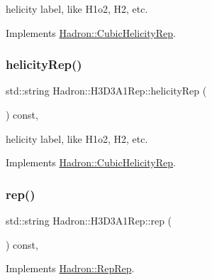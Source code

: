 helicity label, like H1o2, H2, etc. 

Implements \mbox{\hyperlink{structHadron_1_1CubicHelicityRep_af1096946b7470edf0a55451cc662f231}{Hadron\+::\+Cubic\+Helicity\+Rep}}.

\mbox{\label{structHadron_1_1H3D3A1Rep_a70ba9574e123f458fa29aae49a92f425}} 
\subsubsection{\texorpdfstring{helicityRep()}{helicityRep()}\hspace{0.1cm}{\footnotesize\ttfamily [3/3]}}
{\footnotesize\ttfamily std\+::string Hadron\+::\+H3\+D3\+A1\+Rep\+::helicity\+Rep (\begin{DoxyParamCaption}{ }\end{DoxyParamCaption}) const\hspace{0.3cm}{\ttfamily [inline]}, {\ttfamily [virtual]}}

helicity label, like H1o2, H2, etc. 

Implements \mbox{\hyperlink{structHadron_1_1CubicHelicityRep_af1096946b7470edf0a55451cc662f231}{Hadron\+::\+Cubic\+Helicity\+Rep}}.

\mbox{\label{structHadron_1_1H3D3A1Rep_a79c066008e353585d55f726285ae56cd}} 
\subsubsection{\texorpdfstring{rep()}{rep()}\hspace{0.1cm}{\footnotesize\ttfamily [1/5]}}
{\footnotesize\ttfamily std\+::string Hadron\+::\+H3\+D3\+A1\+Rep\+::rep (\begin{DoxyParamCaption}{ }\end{DoxyParamCaption}) const\hspace{0.3cm}{\ttfamily [inline]}, {\ttfamily [virtual]}}



Implements \mbox{\hyperlink{structHadron_1_1RepRep_ab3213025f6de249f7095892109575fde}{Hadron\+::\+Rep\+Rep}}.

\mbox{\label{structHadron_1_1H3D3A1Rep_a79c066008e353585d55f726285ae56cd}} 
